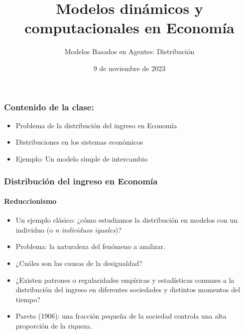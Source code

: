 \documentclass[11pt]{beamer}
\begin{document}
	\title{Modelos dinámicos y computacionales en Economía}
	\subtitle{Modelos Basados en Agentes: Distribución}
	\date{9 de noviembre de 2023}


\begin{frame}
\frametitle{Contenido de la clase:}
\begin{itemize}
	\item Problema de la distribución del ingreso en Economía
    \item Distribuciones en los sistemas económicos
	\item Ejemplo: Un modelo simple de intercambio
\end{itemize}
\end{frame}

\begin{frame}
	\frametitle{Distribución del ingreso en Economía}
	\framesubtitle{Reduccionismo}
	\begin{itemize}
		\item Un ejemplo clásico: ¿cómo estudiamos la distribución en modelos con un individuo (o \textit{n individuos iguales})?
		\item Problema: la naturaleza del fenómeno a analizar.
		\item ¿Cuáles son las causas de la desigualdad?
		\item ¿Existen patrones o regularidades empíricas y estadísticas comunes a la distribución del ingreso en diferentes sociedades y distintos momentos del tiempo?
		\item Pareto (1906): una fracción pequeña de la sociedad controla una alta proporción de la riqueza.
	\end{itemize}
\end{frame}
\end{document}
